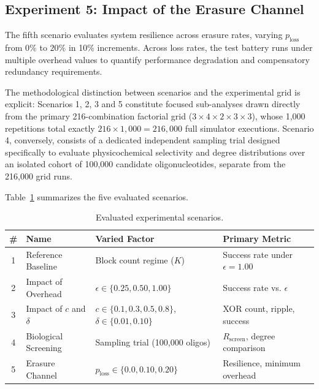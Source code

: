 \subsection{Experiment 5: Impact of the Erasure Channel}

The fifth scenario evaluates system resilience across erasure rates, varying $p_{\text{loss}}$ from $0\%$ to $20\%$ in 10\% increments. Across loss rates, the test battery runs under multiple overhead values to quantify performance degradation and compensatory redundancy requirements.

The methodological distinction between scenarios and the experimental grid is explicit: Scenarios 1, 2, 3 and 5 constitute focused sub-analyses drawn directly from the primary 216-combination factorial grid ($3 \times 4 \times 2 \times 3 \times 3$), whose 1,000 repetitions total exactly $216 \times 1{,}000 = 216{,}000$ full simulator executions. Scenario 4, conversely, consists of a dedicated independent sampling trial designed specifically to evaluate physicochemical selectivity and degree distributions over an isolated cohort of 100,000 candidate oligonucleotides, separate from the 216,000 grid runs.

Table~\ref{tab:cenarios_experimentais} summarizes the five evaluated scenarios.

\begin{table}[htbp]
    \centering
    \small
    \caption{Evaluated experimental scenarios.}
    \label{tab:cenarios_experimentais}
    \begin{tabular}{clp{4.5cm}p{4.5cm}}
        \toprule
        \textbf{\#} & \textbf{Name} & \textbf{Varied Factor} & \textbf{Primary Metric} \\
        \midrule
        1 & Reference Baseline & Block count regime ($K$) & Success rate under $\epsilon = 1.00$ \\
        2 & Impact of Overhead & $\epsilon \in \{0.25, 0.50, 1.00\}$ & Success rate vs. $\epsilon$ \\
        3 & Impact of $c$ and $\delta$ & $c \in \{0.1, 0.3, 0.5, 0.8\}$, $\delta \in \{0.01, 0.10\}$ & XOR count, ripple, success \\
        4 & Biological Screening & Sampling trial (100,000 oligos) & $R_{\text{screen}}$, degree comparison \\
        5 & Erasure Channel & $p_{\text{loss}} \in \{0.0, 0.10, 0.20\}$ & Resilience, minimum overhead \\
        \bottomrule
    \end{tabular}
\end{table}

